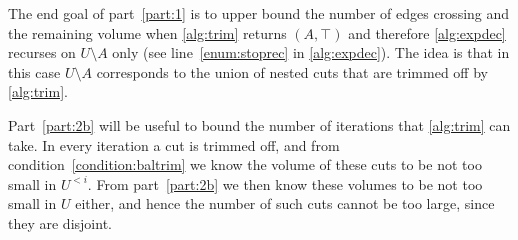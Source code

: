  \noindent
 The end goal of part~\eqref{part:1} is to upper bound the number of edges crossing and the remaining volume when \cref{alg:trim} returns $(A,\top)$ and therefore \cref{alg:expdec} recurses on $U \setminus A$ only (see line~\eqref{enum:stoprec} in \cref{alg:expdec}). The idea is that in this case $U \setminus A$ corresponds to the union of nested cuts that are trimmed off by \cref{alg:trim}.
 
 Part~\eqref{part:2b} will be useful to bound the number of iterations that \cref{alg:trim} can take. In every iteration a cut is trimmed off, and from condition~\eqref{condition:baltrim} we know the volume of these cuts to be not too small in $U^{<i}$. From part~\eqref{part:2b} we then know these volumes to be not too small in $U$ either, and hence the number of such cuts cannot be too large, since they are disjoint.
 
